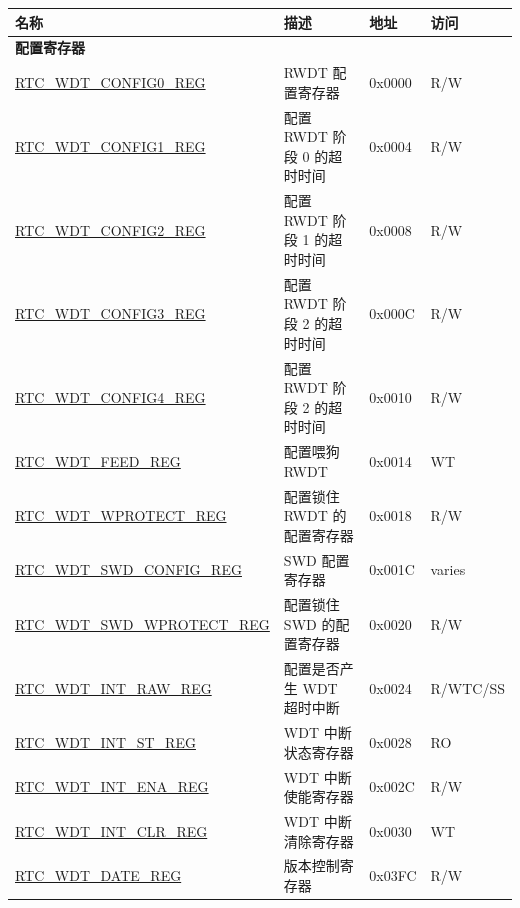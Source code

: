 \begin{longtable}{ | p{6cm} | p{7.2cm} | p{1.3cm} | p{1cm} | }
\hline\rowcolor{lightgray}
\textbf{名称 } & \textbf{描述} &  \textbf{地址} & \textbf{访问} \\ \hline
\endhead
\multicolumn{4}{|l|}{\textbf{配置寄存器}} \\ \hline
\hyperref[regdesc:RTCWDTCONFIG0REG]{RTC\_WDT\_CONFIG0\_REG} & RWDT 配置寄存器 & 0x0000 & R/W \\ \hline
\hyperref[regdesc:RTCWDTCONFIG1REG]{RTC\_WDT\_CONFIG1\_REG} & 配置 RWDT 阶段 0 的超时时间 & 0x0004 & R/W \\ \hline
\hyperref[regdesc:RTCWDTCONFIG2REG]{RTC\_WDT\_CONFIG2\_REG} & 配置 RWDT 阶段 1 的超时时间 & 0x0008 & R/W \\ \hline
\hyperref[regdesc:RTCWDTCONFIG3REG]{RTC\_WDT\_CONFIG3\_REG} & 配置 RWDT 阶段 2 的超时时间 & 0x000C & R/W \\ \hline
\hyperref[regdesc:RTCWDTCONFIG4REG]{RTC\_WDT\_CONFIG4\_REG} & 配置 RWDT 阶段 2 的超时时间 & 0x0010 & R/W \\ \hline
\hyperref[regdesc:RTCWDTFEEDREG]{RTC\_WDT\_FEED\_REG} & 配置喂狗 RWDT & 0x0014 & WT \\ \hline
\hyperref[regdesc:RTCWDTWPROTECTREG]{RTC\_WDT\_WPROTECT\_REG} & 配置锁住 RWDT 的配置寄存器 & 0x0018 & R/W \\ \hline
\hyperref[regdesc:RTCWDTSWDCONFIGREG]{RTC\_WDT\_SWD\_CONFIG\_REG} & SWD 配置寄存器 & 0x001C & varies \\ \hline
\hyperref[regdesc:RTCWDTSWDWPROTECTREG]{RTC\_WDT\_SWD\_WPROTECT\_REG} & 配置锁住 SWD 的配置寄存器 & 0x0020 & R/W \\ \hline
\hyperref[regdesc:RTCWDTINTRAWREG]{RTC\_WDT\_INT\_RAW\_REG} & 配置是否产生 WDT 超时中断 & 0x0024 & R/WTC/SS \\ \hline
\hyperref[regdesc:RTCWDTINTSTREG]{RTC\_WDT\_INT\_ST\_REG} & WDT 中断状态寄存器 & 0x0028 & RO \\ \hline
\hyperref[regdesc:RTCWDTINTENAREG]{RTC\_WDT\_INT\_ENA\_REG} & WDT 中断使能寄存器 & 0x002C & R/W \\ \hline
\hyperref[regdesc:RTCWDTINTCLRREG]{RTC\_WDT\_INT\_CLR\_REG} & WDT 中断清除寄存器 & 0x0030 & WT \\ \hline
\hyperref[regdesc:RTCWDTDATEREG]{RTC\_WDT\_DATE\_REG} & 版本控制寄存器 & 0x03FC & R/W \\ \hline
\end{longtable}
